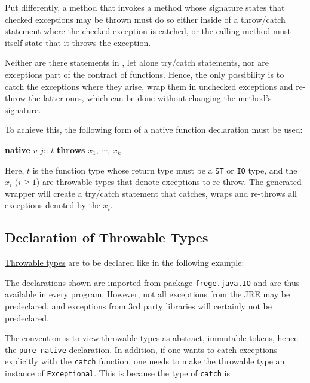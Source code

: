 Put differently, a \java{} method that invokes a method whose signature states that checked exceptions may be thrown must do so either inside of a throw/catch statement where the checked exception is catched, or the calling method must itself state that it throws the exception.

Neither are there statements in \frege{}, let alone try/catch statements, 
nor are exceptions part of the contract of \frege{} functions. 
Hence, the only possibility is to catch the exceptions where they arise, 
wrap them in unchecked exceptions and re-throw the latter ones, 
which can be done without changing the method's signature.

To achieve this, the following form of a native function declaration must be used:

\begin{flushleft}
\textbf{native} $v$ $j$:: $t$ \textbf{throws} $x_1$, $\cdots$, $x_k$
\end{flushleft}

Here, $t$ is the function type whose return type must be a \texttt{ST} or \texttt{IO} type, and the $x_i$ ($i \ge 1$) are \hyperref[throwable]{throwable types} that denote \java{} exceptions to re-throw. The generated wrapper will create a try/catch statement that catches, wraps and re-throws all exceptions denoted by the $x_i$.

\subsection*{Declaration of Throwable Types}

\hyperref[throwable]{Throwable types}  are to be declared like in the following example:


The declarations shown are imported from package \texttt{frege.java.IO} and are thus available in every \frege{} program. However, not all exceptions from the JRE may be predeclared, and exceptions from 3rd party libraries will certainly not be predeclared.

The convention is to view throwable types as abstract, immutable tokens, hence the \texttt{pure native} declaration. In addition, if one wants to catch exceptions explicitly with the \texttt{catch} function, one needs to make the throwable type an instance of \texttt{Exceptional}. This is because the type of \texttt{catch} is

